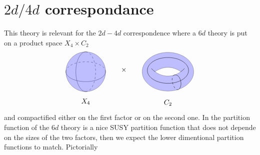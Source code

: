 \chapter{\texorpdfstring{$2d/4d$ correspondance}{2d4d}}
This theory is relevant for the $2d-4d$ correspondence where a $6d$ theory is put on a product space $X_4\times C_2$ 
\begin{equation}
	\begin{tikzpicture}[baseline={(0,0)}]
		\draw (-1,0) arc (180:360:1cm and 0.5cm);
    	\draw[dashed] (-1,0) arc (180:0:1cm and 0.5cm);
    	\draw (0,1) arc (90:270:0.5cm and 1cm);
    	\draw[dashed] (0,1) arc (90:-90:0.5cm and 1cm);
 		\filldraw[fill=blue!50, opacity=.5] (0,0) circle (1cm);

		\node at (0,-1.5) {$X_4$};
	\end{tikzpicture}\qquad\times\qquad
	\begin{tikzpicture}[scale=1.3, baseline={(0,0)}]
		\draw[fill=blue!50,opacity=.5,even odd rule] (0,0) ellipse (1 and .75) 
		(-0.5,0) arc(120:60:1 and 1.25)  arc(-60:-120:1 and 1.25) coordinate[pos=0.25] (xt);
	   \draw (-0.5,0) arc(-120:-130:1 and 1.25) (0.5,0) arc(-60:-50:1 and 1.25);
	   \draw[] (-65:1 and .75) to[out=40,in=10] 
		node[pos=0.2,right]{} (xt);
	   \draw[dashed] (xt) to[out=-170,in=-140] (-65:1 and .75);
	   \draw[] (0.8,0.05) arc(0:360:0.8 and .5) {};
	   \node at (0,-1.2) {$C_2$};
	\end{tikzpicture}
\end{equation}
and compactified either on the first factor or on the second one. In the partition function of the $6d$ theory is a nice SUSY partition function that does not depende on the sizes of the two factors, then we expect the lower dimentional partition functions to match. Pictorially
